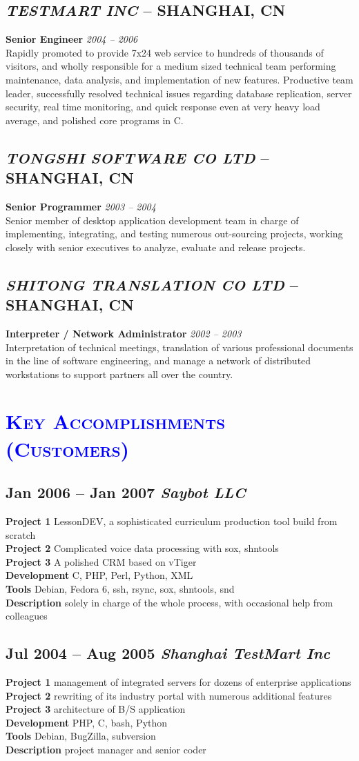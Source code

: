 \documentclass[a4paper,12pt]{article}
\newcommand{\company}[1]{%
  \textsl{#1}}
\newcommand{\itembf}[1]{%
  \textbf{\textcolor{bfcolor}{#1}}}
\newcommand{\ssection}[1]{%
  \section[#1]{\normalsize\scshape\textcolor{blue}{#1}}}
\newcommand{\ssubsection}[1]{%
  \subsection[#1]{\normalsize\textbf #1}}
\begin{document}
	\ssubsection{\-\company{TESTMART INC} -- SHANGHAI, CN}
	\textbf{Senior Engineer} \textsl{2004 -- 2006}\\
	Rapidly promoted to provide 7x24 web service to hundreds of thousands of visitors, and wholly responsible for a medium sized technical team performing maintenance, data analysis, and implementation of new features. Productive team leader, successfully resolved technical issues regarding database replication, server security, real time monitoring, and quick response even at very heavy load average, and polished core programs in C.\\

	\ssubsection{\-\company{TONGSHI SOFTWARE CO LTD} -- SHANGHAI, CN}
	\textbf{Senior Programmer} \textsl{2003 -- 2004}\\
	Senior member of desktop application development team in charge of implementing, integrating, and testing numerous out-sourcing projects, working closely with senior executives to analyze, evaluate and release projects.

	\ssubsection{\company{SHITONG TRANSLATION CO LTD} -- SHANGHAI, CN}
	\textbf{Interpreter / Network Administrator} \textsl{2002 -- 2003}\\
	Interpretation of technical meetings, translation of various professional documents in the line of software engineering, and manage a network of distributed workstations to support partners all over the country.

\ssection{Key Accomplishments (Customers)}

	\ssubsection{Jan 2006 -- Jan 2007 \company{Saybot LLC}}
		\itembf{Project 1} LessonDEV, a sophisticated curriculum production tool build from scratch\\
		\itembf{Project 2} Complicated voice data processing with sox, shntools\\
		\itembf{Project 3} A polished CRM based on vTiger\\
		\itembf{Development} C, PHP, Perl, Python, XML\\
		\itembf{Tools} Debian, Fedora 6, ssh, rsync, sox, shntools, snd\\
		\itembf{Description} solely in charge of the whole process, with occasional help from colleagues

	\ssubsection{Jul 2004 -- Aug 2005 \company{Shanghai TestMart Inc}}
		\itembf{Project 1}  management of integrated servers for dozens of enterprise applications\\
		\itembf{Project 2}  rewriting of its industry portal with numerous additional features\\
		\itembf{Project 3}  architecture of B/S application\\
		\itembf{Development} PHP, C, bash, Python\\
		\itembf{Tools} Debian, BugZilla, subversion\\
		\itembf{Description} project manager and senior coder
\end{document}
